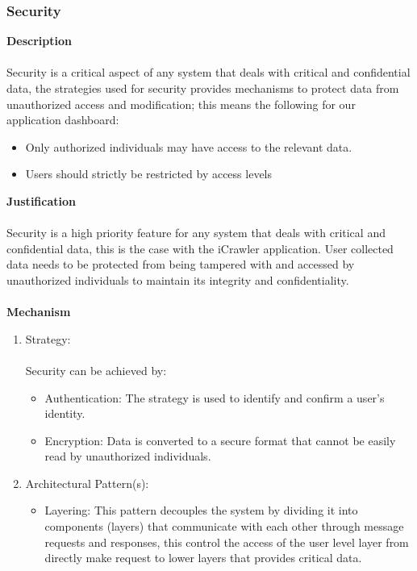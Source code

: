 			\subsubsection*{Security}
				\textbf{Description} \\\\
				Security is a critical aspect of any system that deals with critical and confidential data, the strategies used for security provides mechanisms to protect data from unauthorized access and modification; this means the following for our application dashboard:
				\begin{itemize}
					\item Only authorized individuals may have access to the relevant data.
					\item Users should strictly be restricted by access levels    
				\end{itemize}
				\textbf{Justification} \\\\
				Security is a high priority feature for any system that deals with critical and confidential data, this is the case with the iCrawler application. User collected data needs to be protected from being tampered with and accessed by unauthorized individuals to maintain its integrity and confidentiality.\\\\
				\textbf{Mechanism}
				\begin{enumerate}
					\item Strategy: \\\\
						Security can be achieved by:
						\begin{itemize}
							\item Authentication: The strategy is used to identify and confirm a user's identity.  
							\item Encryption: Data is converted to a secure format that cannot be easily read by unauthorized individuals. 
						\end{itemize}
					\item Architectural Pattern(s):
						\begin{itemize}
							\item Layering: This pattern decouples the system by dividing it into components (layers) that communicate with each other through message requests and responses, this control the access of the user level layer from directly make request to lower layers that provides critical data. 
						\end{itemize}
				\end{enumerate}		
